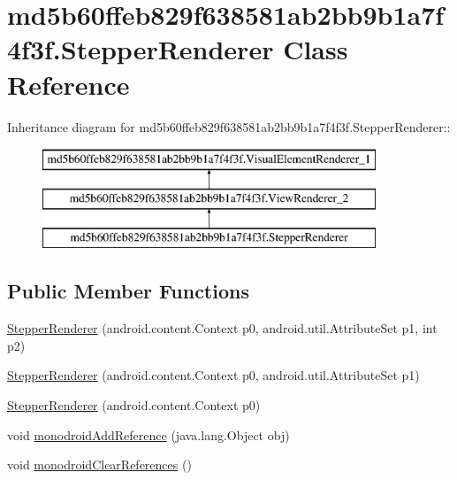 \hypertarget{classmd5b60ffeb829f638581ab2bb9b1a7f4f3f_1_1_stepper_renderer}{
\section{md5b60ffeb829f638581ab2bb9b1a7f4f3f.StepperRenderer Class Reference}
\label{classmd5b60ffeb829f638581ab2bb9b1a7f4f3f_1_1_stepper_renderer}
}
Inheritance diagram for md5b60ffeb829f638581ab2bb9b1a7f4f3f.StepperRenderer::\begin{figure}[H]
\begin{center}
\leavevmode
\includegraphics[height=3cm]{classmd5b60ffeb829f638581ab2bb9b1a7f4f3f_1_1_stepper_renderer}
\end{center}
\end{figure}
\subsection*{Public Member Functions}
\begin{CompactItemize}
\item 
\hyperlink{classmd5b60ffeb829f638581ab2bb9b1a7f4f3f_1_1_stepper_renderer_2ef88542d6857f04d735dda737d2dce5}{StepperRenderer} (android.content.Context p0, android.util.AttributeSet p1, int p2)
\item 
\hyperlink{classmd5b60ffeb829f638581ab2bb9b1a7f4f3f_1_1_stepper_renderer_fe7aea890375adfb8ffdd5ac53251bf3}{StepperRenderer} (android.content.Context p0, android.util.AttributeSet p1)
\item 
\hyperlink{classmd5b60ffeb829f638581ab2bb9b1a7f4f3f_1_1_stepper_renderer_990efbc9f4d9a90ef0b0ffdf69560899}{StepperRenderer} (android.content.Context p0)
\item 
void \hyperlink{classmd5b60ffeb829f638581ab2bb9b1a7f4f3f_1_1_stepper_renderer_772f7be0ba769c29dffe9b37cca95502}{monodroidAddReference} (java.lang.Object obj)
\item 
void \hyperlink{classmd5b60ffeb829f638581ab2bb9b1a7f4f3f_1_1_stepper_renderer_47b2498d2f24016154368d5bb6dd5843}{monodroidClearReferences} ()
\end{CompactItemize}
